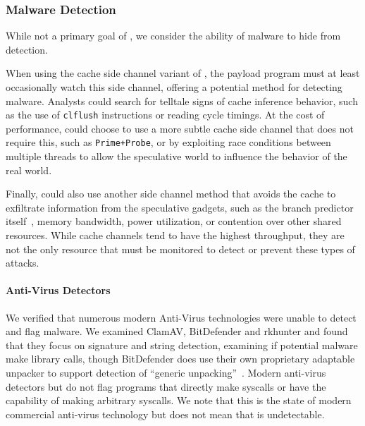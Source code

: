 \subsubsection{Malware Detection}
\label{subsubsec:malware}
While not a primary goal of \speculake, we consider the ability of \speculake
malware to hide from detection.

When using the cache side channel variant of \speculake, the payload
program must at least occasionally watch this side channel, offering a
potential method for detecting \speculake malware.
Analysts could search for telltale signs of cache inference behavior, such as
the use of \texttt{clflush} instructions or reading cycle timings. At the cost
of performance, \speculake could choose to use a more subtle cache side channel
that does not require this, such as \texttt{Prime+Probe}, or by exploiting race
conditions between multiple threads to allow the speculative world to influence
the behavior of the real world.

Finally, \speculake could also use another side channel method that
avoids the cache
to exfiltrate information from the speculative gadgets, such as the branch
predictor itself~\cite{evtyushkin2018branchscope}, memory bandwidth, power
utilization, or contention over other shared resources. While cache 
channels tend to have the highest throughput, they are not the only 
resource that must be monitored to detect or prevent these types of attacks. 

\paragraph{Anti-Virus Detectors}
We verified that numerous modern Anti-Virus technologies were unable to detect
and flag \speculake malware. We examined ClamAV, BitDefender and rkhunter and
found that they focus on signature and string detection, examining if potential
malware make library calls, though BitDefender does use their own proprietary
adaptable unpacker to support detection of ``generic
unpacking''~\cite{BitDefender}. Modern anti-virus detectors but do not flag
programs that directly make syscalls or have the capability of making arbitrary
syscalls. We note that this is the state of modern commercial anti-virus
technology but does not mean that \speculake is undetectable.

